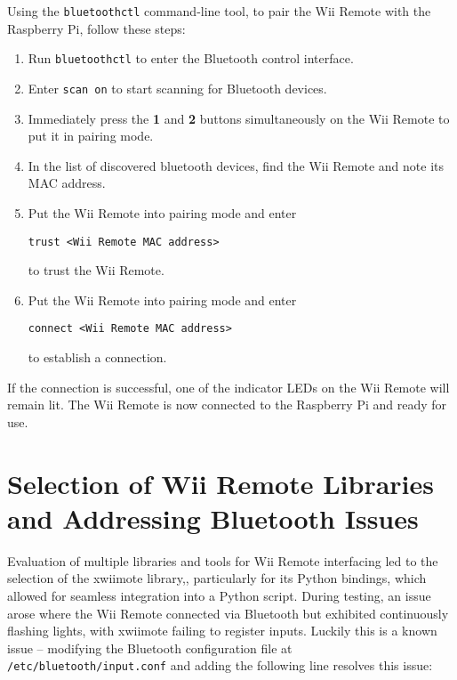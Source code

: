Using the \texttt{bluetoothctl}\cite{bluetoothctl} command-line tool, to pair the Wii Remote with the Raspberry Pi, follow these steps:

\begin{enumerate}
	\item Run \texttt{bluetoothctl} to enter the Bluetooth control interface.
	\item Enter \texttt{scan on} to start scanning for Bluetooth devices.
	\item Immediately press the \textbf{1} and \textbf{2} buttons simultaneously on the Wii Remote to put it in pairing mode.
	\item In the list of discovered bluetooth devices, find the Wii Remote and note its MAC address.
  \item Put the Wii Remote into pairing mode and enter
		\begin{verbatim}
trust <Wii Remote MAC address>

\end{verbatim}
		to trust the Wii Remote.

  \item Put the Wii Remote into pairing mode and enter
\begin{verbatim}
connect <Wii Remote MAC address>
\end{verbatim}
		to establish a connection.

\end{enumerate}

If the connection is successful, one of the indicator LEDs on the Wii Remote will remain lit. The Wii Remote is now connected to the Raspberry Pi and ready for use.

\section{Selection of Wii Remote Libraries and Addressing Bluetooth Issues}

Evaluation of multiple libraries and tools for Wii Remote interfacing led to the selection of the xwiimote\cite{xwiimote} library,, particularly for its Python
bindings\cite{xwiimote_bindings}, which allowed for seamless integration into a
Python script. During testing, an issue arose where the Wii Remote connected via
Bluetooth but exhibited continuously flashing lights, with xwiimote failing to
register inputs. Luckily this is a known issue\cite{xwiimote_issue} -- modifying
the Bluetooth configuration file at \texttt{/etc/bluetooth/input.conf} and
adding the following line resolves this issue:

